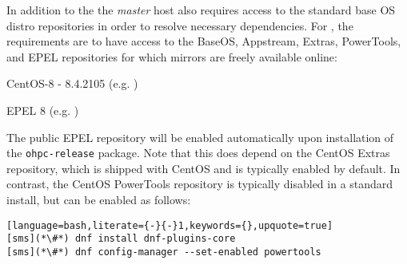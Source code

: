 In addition to the \OHPC{}
\iftoggle{isxCAT}{and \xCAT{} package repositories,}{package repository,}
the {\em master} host also requires access to the standard base OS distro
repositories in order to resolve necessary dependencies. For \baseOS{}, the
requirements are to have access to the BaseOS, Appstream, Extras, PowerTools,
and EPEL repositories for which mirrors are freely available online:

\begin{itemize*}
\item CentOS-8 - 8.4.2105
  (e.g. \href{http://mirror.centos.org/centos-8/8/}
             {\color{blue}{http://mirror.centos.org/centos-8/8/}} )
\item EPEL 8 (e.g. \href{http://download.fedoraproject.org/pub/epel/8/}
                        {\color{blue}{http://download.fedoraproject.org/pub/epel/8/}} )
\end{itemize*}

\noindent The public EPEL repository will be enabled automatically upon
installation of the \texttt{ohpc-release} package. Note that this does depend
on the CentOS Extras repository, which is shipped with CentOS and is typically
enabled by default.  In contrast, the CentOS PowerTools repository is typically
disabled in a standard install, but can be enabled as follows:

\begin{lstlisting}[language=bash,literate={-}{-}1,keywords={},upquote=true]
[sms](*\#*) dnf install dnf-plugins-core
[sms](*\#*) dnf config-manager --set-enabled powertools
\end{lstlisting}
